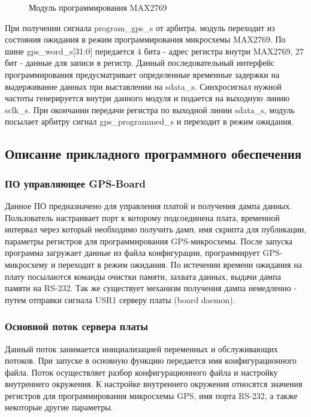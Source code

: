 \begin{figure}[H]
\begin{center}
\end{center}
\caption{Модуль программирования MAX2769}
\label{pic:gps_program}
\end{figure}

При получении сигнала program\_gps\_s от арбитра, модуль переходит из состояния ожидания в режим программирования микросхемы
MAX2769. По шине gps\_word\_s[31:0] передается 4 бита - адрес регистра внутри MAX2769, 27 бит - данные для записи в регистр.
Данный последовательный интерфейс программирования предусматривает определенные временные задержки на выдерживание данных
при выставлении на sdata\_s. Синхросигнал нужной частоты генерируется внутри данного модуля и подается на выходную линию sclk\_s.
При окончании передачи регистра по выходной линии sdata\_s, модуль посылает арбитру сигнал gps\_programmed\_s и переходит в режим
ожидания.

\subsection{Описание прикладного программного обеспечения}
\subsubsection*{ПО управляющее GPS-Board}
\label{sec:board_daemon}
Данное ПО предназначено для управления платой и получения дампа данных. Пользователь настраивает порт к которому подсоединена плата,
временной интервал через который необходимо получить дамп, имя скрипта для публикации, параметры регистров для программирования
GPS-микросхемы. После запуска программа загружает данные из файла конфигурации, программирует GPS-микросхему и переходит в режим
ожидания. По истечении времени ожидания на плату посылаются команды очистки памяти, захвата данных, выдачи дампа памяти на RS-232.
Так же существует механизм получения дампа немедленно - путем отправки сигнала USR1 серверу платы (board daemon).

\subsubsection*{Основной поток сервера платы}
Данный поток занимается инициализацией переменных и обслуживающих потоков. При запуске в основную функцию передается
имя конфигурационного файла. Поток осуществляет разбор конфигурационного файла и настройку внутреннего окружения.
К настройке внутреннего окружения относятся значения регистров для программирования микросхемы GPS, имя порта RS-232, а
также некоторые другие параметры.

